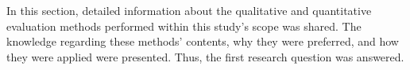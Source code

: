 In this section, detailed information about the qualitative and quantitative evaluation methods performed within this study's scope was shared. The knowledge regarding these methods' contents, why they were preferred, and how they were applied were presented. Thus, the first research question was answered.